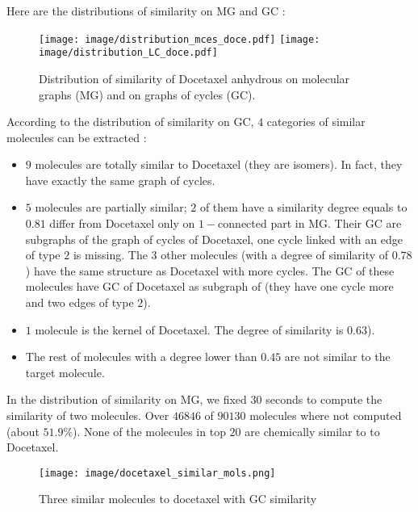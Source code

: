 \documentclass[journal=jacsat,manuscript=article]{achemso}
\begin{document}
  Here are the distributions of similarity on MG and GC :
 \begin{figure}[H]
 \begin{center}
\texttt{[image: image/distribution\_mces\_doce.pdf]}  
 \texttt{[image: image/distribution\_LC\_doce.pdf]} 
\end{center}
\caption{Distribution of similarity of Docetaxel anhydrous on molecular graphs (MG)  and on graphs of cycles (GC).}
\label{doce-dis}
 \end{figure}
 
 According to the distribution of similarity on GC, $4$ categories of similar molecules can be extracted :
 
 \begin{itemize}
 
 \item $9$ molecules are totally similar to Docetaxel (they are isomers). In fact, they have exactly the same graph of cycles. 
 \item $5$ molecules are partially similar; $2$ of them have a similarity degree equals to $0.81$ differ from Docetaxel only on $1-$connected part in MG. Their GC are subgraphs of the graph of cycles of Docetaxel, one cycle linked with an edge of type $2$ is missing.  The $3$ other molecules (with a degree of similarity of $0.78$) have the same structure as Docetaxel with more cycles. The GC of these molecules have GC of Docetaxel as subgraph of (they have one cycle more and two edges of type $2$).
 \item $1$ molecule is the kernel of Docetaxel. The degree of similarity is $0.63$).
 \item The rest of molecules with a degree lower than $0.45$ are not similar to the target molecule. 
\end{itemize}  
 
 In the distribution of similarity on MG, we fixed $30$ seconds to compute the similarity of two molecules. Over $46846$ of $90130$ molecules where not computed (about  $51.9 \%$). None of the molecules in top $20$ are chemically similar to to Docetaxel.
 
 
 \begin{figure}[H]
 \label{similardoce}
 \begin{center}
\texttt{[image: image/docetaxel\_similar\_mols.png]}
\end{center}
\caption{ Three similar molecules to docetaxel with GC similarity}
 \end{figure}
 
\end{document}
